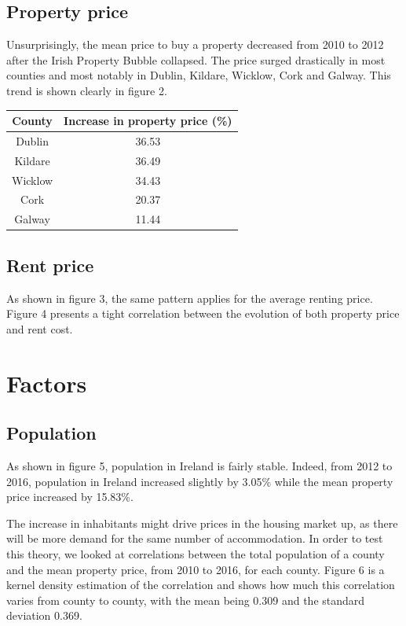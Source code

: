 \documentclass[twocolumn]{article}
\begin{document}
\subsection{Property price}
Unsurprisingly, the mean price to buy a property decreased from 2010 to 2012 after the Irish Property Bubble collapsed. The price surged drastically in most counties and most notably in Dublin, Kildare, Wicklow, Cork and Galway. This trend is shown clearly in figure 2. \begin{center}
\begin{tabular}{||c c||}
 \hline
 County & Increase in property price (\%) \\ [0.5ex]
 \hline\hline
 Dublin & 36.53 \\
 \hline
 Kildare & 36.49 \\
 \hline
 Wicklow & 34.43 \\
 \hline
 Cork & 20.37 \\
 \hline
 Galway & 11.44 \\ [1ex]
 \hline
\end{tabular}
\end{center}

\subsection{Rent price}
As shown in figure 3, the same pattern applies for the average renting price. Figure 4 presents a tight correlation between the evolution of both property price and rent cost.

\section{Factors}
\subsection{Population}
As shown in figure 5, population in Ireland is fairly stable. Indeed, from 2012 to 2016, population in Ireland increased slightly by 3.05\% while the mean property price increased by 15.83\%.

The increase in inhabitants might drive prices in the housing market up, as there will be more demand for the same number of accommodation. In order to test this theory, we looked at correlations between the total population of a county and the mean property price, from 2010 to 2016, for each county. Figure 6 is a kernel density estimation of the correlation and shows how much this correlation varies from county to county, with the mean being 0.309 and the standard deviation 0.369.
\end{document}
